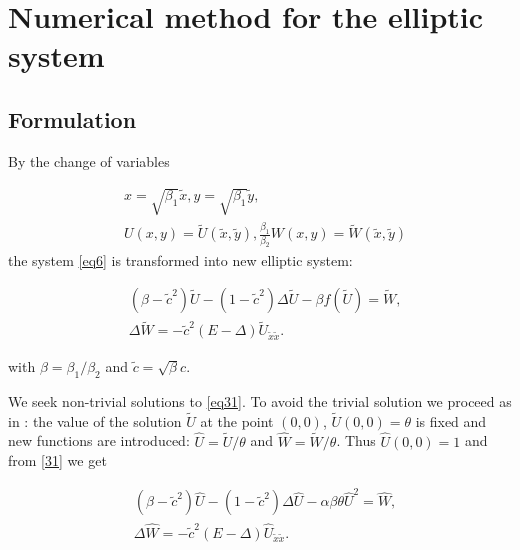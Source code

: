 \documentclass[12pt]{article}
\theoremstyle{theorem}
\theoremstyle{defi}
\begin{document}
\section{Numerical method for the elliptic system}

\subsection{Formulation}


By the change of variables

\begin{equation}\label{eqVCN}
\begin{split}
&x=\sqrt{\beta_1} { \tilde{x} }, y=\sqrt{\beta_1} { \tilde{ y} },\\
&U(x,y)= \tilde U({ \tilde{x} },{ \tilde{y} } ), \frac{\beta_1}{\beta_2} W(x,y)=  \tilde W({ \tilde{x} },{ \tilde{y} } )
\end{split}
\end{equation}
 the system \eqref{eq6} is transformed into new elliptic system:

\begin{equation}\label{eq31}
\begin{split}
&(\beta-\tilde c ^2) \tilde U  -(1- \tilde c^2) \Delta \tilde U - \beta f( \tilde U ) = \tilde W, \\
&\Delta \tilde W =  - \tilde c^2 (E- \Delta) \tilde U_{\tilde x \tilde x}. 
\end{split}
\end{equation}

with $\beta = \beta_1 / \beta_2$ and $ \tilde c = \sqrt {\beta} c$.

We seek  non-trivial solutions to \eqref{eq31}. To avoid the trivial solution we proceed as in \cite{ref6}: the value of the solution $\tilde U$ at the point $(0,0)$,  $\tilde U(0,0)=\theta $ is fixed and new  functions are introduced: $\widehat{U}=\tilde U /{\theta} $ and $\widehat{W}=\tilde W /{\theta} $. Thus  
$ \widehat{U}(0,0)=1$ and from \eqref{31} we get

\begin{equation}\label{eq32}
\begin{split}
& (\beta-\tilde c^2) \widehat{U}  -(1-\tilde c^2) \Delta \widehat{U} - \alpha \beta \theta \widehat{U}^2 = \widehat{W}, \\
&\Delta \widehat{W} = - \tilde c^2 (E- \Delta) \widehat{U}_{\tilde x \tilde x}.
\end{split}
\end{equation}
\end{document}
